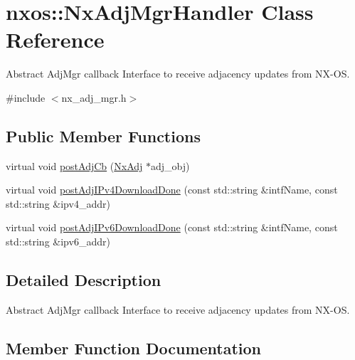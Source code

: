 \hypertarget{classnxos_1_1_nx_adj_mgr_handler}{}\section{nxos\+:\+:Nx\+Adj\+Mgr\+Handler Class Reference}
\label{classnxos_1_1_nx_adj_mgr_handler}


Abstract Adj\+Mgr callback Interface to receive adjacency updates from N\+X-\/\+OS.  




{\ttfamily \#include $<$nx\+\_\+adj\+\_\+mgr.\+h$>$}

\subsection*{Public Member Functions}
\begin{DoxyCompactItemize}
\item 
virtual void \mbox{\hyperlink{classnxos_1_1_nx_adj_mgr_handler_a9a1f85f218eab71d9c280088f69a14dc}{post\+Adj\+Cb}} (\mbox{\hyperlink{classnxos_1_1_nx_adj}{Nx\+Adj}} $\ast$adj\+\_\+obj)
\item 
virtual void \mbox{\hyperlink{classnxos_1_1_nx_adj_mgr_handler_a84d9b92c976ae528c72e93ab3a75ecd1}{post\+Adj\+I\+Pv4\+Download\+Done}} (const std\+::string \&intf\+Name, const std\+::string \&ipv4\+\_\+addr)
\item 
virtual void \mbox{\hyperlink{classnxos_1_1_nx_adj_mgr_handler_af187f3d933d1b58547447004e4aebef6}{post\+Adj\+I\+Pv6\+Download\+Done}} (const std\+::string \&intf\+Name, const std\+::string \&ipv6\+\_\+addr)
\end{DoxyCompactItemize}


\subsection{Detailed Description}
Abstract Adj\+Mgr callback Interface to receive adjacency updates from N\+X-\/\+OS. 

\subsection{Member Function Documentation}
\mbox{\label{classnxos_1_1_nx_adj_mgr_handler_a9a1f85f218eab71d9c280088f69a14dc}} 
